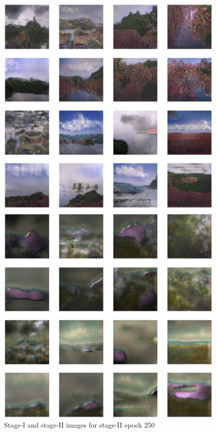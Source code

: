 \documentclass{article}
\begin{document}
	\begin{figure}[h]
	\centering
	\includegraphics[scale=0.6]{images/epoch250_FID414.png}
	\caption{Stage-I and stage-II images for stage-II epoch 250}
	\end{figure}
\end{document}
